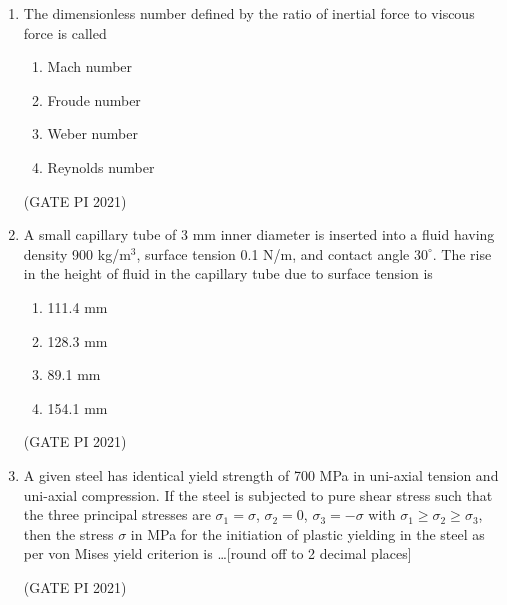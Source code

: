 \documentclass[journal,12pt,onecolumn]{IEEEtran}
\theoremstyle{remark}
\begin{document}
\begin{enumerate}
\begin{multicols}{4}
\begin{enumerate}
\item 10.7
\item 60.9
\item 121.9
\item 1005.3
\end{enumerate}
\end{multicols}

\hfill (GATE PI 2021)

\item
The dimensionless number defined by the ratio of inertial force to viscous force is called
\begin{multicols}{4}
\begin{enumerate}
\item Mach number
\item Froude number
\item Weber number
\item Reynolds number
\end{enumerate}
\end{multicols}
\hfill (GATE PI 2021)

\item
A small capillary tube of 3 mm inner diameter is inserted into a fluid having density 900 kg/m$^3$, surface tension 0.1 N/m, and contact angle $30^\circ$. The rise in the height of fluid in the capillary tube due to surface tension is
\begin{multicols}{4}
\begin{enumerate}
\item 111.4 mm
\item 128.3 mm
\item 89.1 mm
\item 154.1 mm
\end{enumerate}
\end{multicols}

\hfill (GATE PI 2021)

\item
A given steel has identical yield strength of 700 MPa in uni-axial tension and uni-axial compression. If the steel is subjected to pure shear stress such that the three principal stresses are $\sigma_1 = \sigma$, $\sigma_2 = 0$, $\sigma_3 = -\sigma$ with $\sigma_1 \geq \sigma_2 \geq \sigma_3$, then the stress $\sigma$ in MPa for the initiation of plastic yielding in the steel as per von Mises yield criterion is \dots [round off to 2 decimal places]

\hfill (GATE PI 2021)


\end{enumerate}
\end{document}
